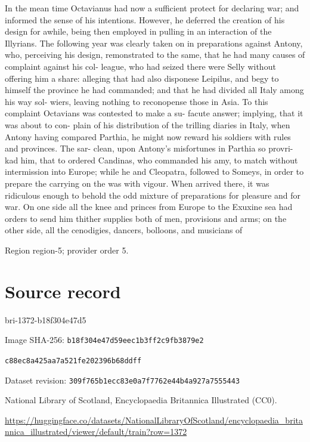 \documentclass[11pt]{article}
\begin{document}
In the mean time Octavianus had now a sufficient protect for declaring war; and informed the sense of his intentions. However, he deferred the creation of his design for awhile, being then employed in pulling in an interaction of the Illyrians. The following year was clearly taken on in preparations against Antony, who, perceiving his design, remonstrated to the same, that he had many causes of complaint against his col- league, who had seized there were Selly without offering him a share: alleging that had also disponese Leipilus, and begy to himself the province he had commanded; and that he had divided all Italy among his way sol- wiers, leaving nothing to reconopense those in Asia. To this complaint Octavians was contested to make a su- facute answer; implying, that it was about to con- plain of his distribution of the trilling diaries in Italy, when Antony having compared Parthia, he might now reward his soldiers with rules and provinces. The sar- clean, upon Antony's misfortunes in Parthia so provri- kad him, that to ordered Candinas, who commanded his amy, to match without intermission into Europe; while he and Cleopatra, followed to Someys, in order to prepare the carrying on the was with vigour. When arrived there, it was ridiculous enough to behold the odd mixture of preparations for pleasure and for war. On one side all the knee and princes from Europe to the Exuxine sea had orders to send him thither supplies both of men, provisions and arms; on the other side, all the cenodigies, dancers, bolloons, and musicians of
\par

{\scriptsize\color{gray} Region region-5; provider order 5.\par}
\medskip
\newpage\section*{Source record}
bri-1372-b18f304e47d5\par
Image SHA-256: \texttt{b18f304e47d59eec1b3ff2c9fb3879e2}\par\texttt{c88ec8a425aa7a521fe202396b68ddff}\par
Dataset revision: \texttt{309f765b1ecc83e0a7f7}\texttt{762e44b4a927a7555443}\par
National Library of Scotland, Encyclopaedia Britannica Illustrated (CC0).\par
\url{https://huggingface.co/datasets/NationalLibraryOfScotland/encyclopaedia_britannica_illustrated/viewer/default/train?row=1372}
\end{document}
